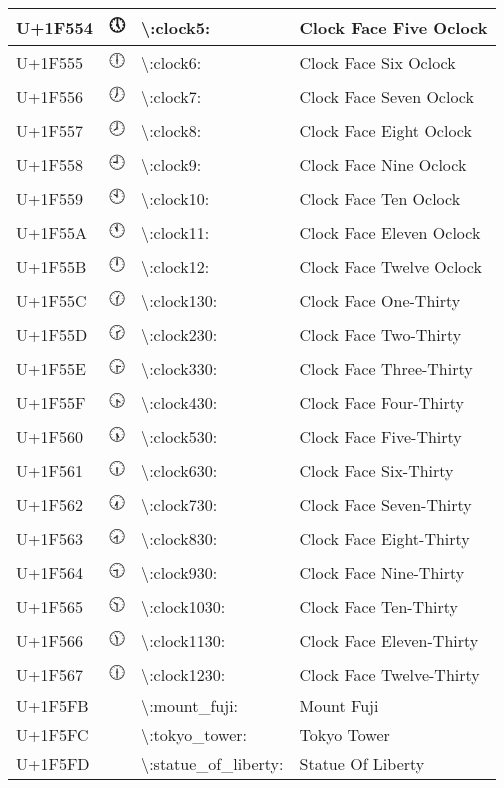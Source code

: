\begin{table}[h]
\begin{tabulary}{\linewidth}{|L|L|L|L|}
\hline
U+1F554 & 🕔 & {\textbackslash}:clock5: & Clock Face Five Oclock \\
\hline
U+1F555 & 🕕 & {\textbackslash}:clock6: & Clock Face Six Oclock \\
\hline
U+1F556 & 🕖 & {\textbackslash}:clock7: & Clock Face Seven Oclock \\
\hline
U+1F557 & 🕗 & {\textbackslash}:clock8: & Clock Face Eight Oclock \\
\hline
U+1F558 & 🕘 & {\textbackslash}:clock9: & Clock Face Nine Oclock \\
\hline
U+1F559 & 🕙 & {\textbackslash}:clock10: & Clock Face Ten Oclock \\
\hline
U+1F55A & 🕚 & {\textbackslash}:clock11: & Clock Face Eleven Oclock \\
\hline
U+1F55B & 🕛 & {\textbackslash}:clock12: & Clock Face Twelve Oclock \\
\hline
U+1F55C & 🕜 & {\textbackslash}:clock130: & Clock Face One-Thirty \\
\hline
U+1F55D & 🕝 & {\textbackslash}:clock230: & Clock Face Two-Thirty \\
\hline
U+1F55E & 🕞 & {\textbackslash}:clock330: & Clock Face Three-Thirty \\
\hline
U+1F55F & 🕟 & {\textbackslash}:clock430: & Clock Face Four-Thirty \\
\hline
U+1F560 & 🕠 & {\textbackslash}:clock530: & Clock Face Five-Thirty \\
\hline
U+1F561 & 🕡 & {\textbackslash}:clock630: & Clock Face Six-Thirty \\
\hline
U+1F562 & 🕢 & {\textbackslash}:clock730: & Clock Face Seven-Thirty \\
\hline
U+1F563 & 🕣 & {\textbackslash}:clock830: & Clock Face Eight-Thirty \\
\hline
U+1F564 & 🕤 & {\textbackslash}:clock930: & Clock Face Nine-Thirty \\
\hline
U+1F565 & 🕥 & {\textbackslash}:clock1030: & Clock Face Ten-Thirty \\
\hline
U+1F566 & 🕦 & {\textbackslash}:clock1130: & Clock Face Eleven-Thirty \\
\hline
U+1F567 & 🕧 & {\textbackslash}:clock1230: & Clock Face Twelve-Thirty \\
\hline
U+1F5FB & 🗻 & {\textbackslash}:mount\_fuji: & Mount Fuji \\
\hline
U+1F5FC & 🗼 & {\textbackslash}:tokyo\_tower: & Tokyo Tower \\
\hline
U+1F5FD & 🗽 & {\textbackslash}:statue\_of\_liberty: & Statue Of Liberty \\

\end{tabulary}
\end{table}
